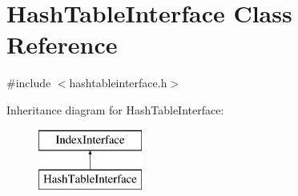 \hypertarget{class_hash_table_interface}{}\section{Hash\+Table\+Interface Class Reference}
\label{class_hash_table_interface}


{\ttfamily \#include $<$hashtableinterface.\+h$>$}

Inheritance diagram for Hash\+Table\+Interface\+:\begin{figure}[H]
\begin{center}
\leavevmode
\includegraphics[height=2.000000cm]{class_hash_table_interface}
\end{center}
\end{figure}
